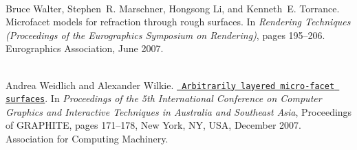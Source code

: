 \begin{DoxyDescription}
\item[\label{citelist_CITEREF_Walter:2007:Microfacet}%
\Hypertarget{citelist_CITEREF_Walter:2007:Microfacet}%
\mbox{[}19\mbox{]}]\hfill \\
Bruce Walter, Stephen~R. Marschner, Hongsong Li, and Kenneth~E. Torrance. Microfacet models for refraction through rough surfaces. In {\itshape Rendering Techniques (Proceedings of the Eurographics Symposium on Rendering)}, pages 195--206. Eurographics Association, June 2007. 


\item[\label{citelist_CITEREF_Weidlich:2007:Arbitrarily}%
\Hypertarget{citelist_CITEREF_Weidlich:2007:Arbitrarily}%
\mbox{[}20\mbox{]}]\hfill \\
Andrea Weidlich and Alexander Wilkie. \href{https://doi.org/10.1145/1321261.1321292}{\texttt{ Arbitrarily layered micro-\/facet surfaces}}. In {\itshape Proceedings of the 5th International Conference on Computer Graphics and Interactive Techniques in Australia and Southeast Asia}, Proceedings of GRAPHITE, pages 171--178, New York, NY, USA, December 2007. Association for Computing Machinery. 


\end{DoxyDescription}